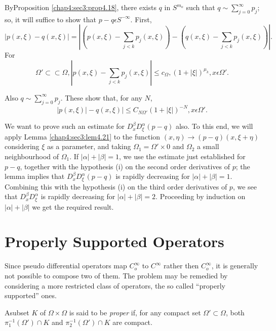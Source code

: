\begin{proof of the theorem}
  By\pageoriginale Proposition \ref{chap4:sec3:prop4.18}, there exists $q$ in $S^{m_o}$ such that $q \sim
  \sum \limits^{\infty}_{j=0}p_j$; so, it will suffice to show that $p-q
  \epsilon S^{-\infty}$. First, 
  $$
  |p(x,\xi)-q(x,\xi)|=|(p(x,\xi)-\sum_{j <
    k}p_j(x,\xi))-(q(x,\xi)-\sum_{j < k}p_j(x,\xi))|. 
  $$
  For
  $$
  \Omega'\subset\subset \Omega, |p(x,\xi)-\sum_{j < k}p_j(x,\xi)|\le c_\Omega
  ,(1+|\xi|)^{\mu_k}, x \epsilon \Omega'. 
  $$
  
  Also $q \sim \sum \limits^{\infty}_{j=0}p_j$. These show that, for any $N$,
  $$
  |p(x,\xi)|-q(x,\xi)|\le C_{N\Omega'}(1+|\xi|)^{-N}, x \epsilon \Omega'.
  $$
\end{proof of the theorem}

We want to prove such an estimate for $D^\beta_x D^\alpha_\xi(p-q)$
also.  To this end, we will apply Lemma \ref{chap4:sec3:lem4.21} to the function
$(x,\eta)\to (p-q)(x, \xi +\eta)$ considering $\xi$ as a parameter,
and taking $\Omega_1=\Omega' \times {0}$ and $\Omega_2$ a small
neighbourhood of $\Omega_1$. If $|\alpha|+|\beta|=1$, we use the
estimate just established for $p-q$, together with the hypothesis
(i) on the second order derivatives of $p$; the lemma implies that
$D^\beta_x D^\alpha_\xi(p-q)$ is rapidly decreasing for
$|\alpha|+|\beta|=1$. Combining this with the hypothesis (i) on the
third order derivatives of $p$, we see that $D^\beta_x D^\alpha_\xi$
is rapidly decreasing for $|\alpha|+|\beta|=2$. Proceeding by
induction on $|\alpha|+|\beta|$ we get the required result. 

\section{Properly Supported Operators} \label{chap4:sec4} 

Since pseudo differential operators map $C^\infty_o$ to $C^\infty$
rather then $C^\infty_o$, it is generally not possible to compose two
of them. The problem may be remedied by considering a more restricted
class of operators, the so called ``properly supported'' ones. 

\setcounter{defi}{21}
\begin{defi} \label{chap4:sec4:def4.22} 
  A\pageoriginale subset $K$ of $\Omega \times \Omega $ is said to be
  {\em proper} if, 
  for any compact set $\Omega' \subset \Omega$, both
  $\pi^{-1}_1(\Omega')\cap K$ and $\pi^{-1}_2 (\Omega') \cap K$ are
  compact. 
\end{defi}

